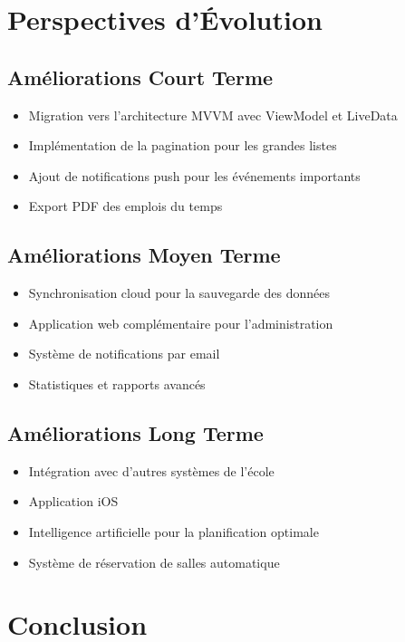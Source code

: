\documentclass[12pt,a4paper]{report}
\begin{document}
\section{Perspectives d'Évolution}

\subsection{Améliorations Court Terme}

\begin{itemize}
    \item Migration vers l'architecture MVVM avec ViewModel et LiveData
    \item Implémentation de la pagination pour les grandes listes
    \item Ajout de notifications push pour les événements importants
    \item Export PDF des emplois du temps
\end{itemize}

\subsection{Améliorations Moyen Terme}

\begin{itemize}
    \item Synchronisation cloud pour la sauvegarde des données
    \item Application web complémentaire pour l'administration
    \item Système de notifications par email
    \item Statistiques et rapports avancés
\end{itemize}

\subsection{Améliorations Long Terme}

\begin{itemize}
    \item Intégration avec d'autres systèmes de l'école
    \item Application iOS
    \item Intelligence artificielle pour la planification optimale
    \item Système de réservation de salles automatique
\end{itemize}

\section{Conclusion}
\end{document}
